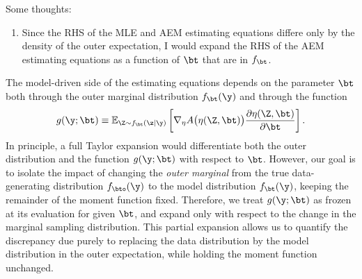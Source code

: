 Some thoughts:
\begin{enumerate}
    \item Since the RHS of the MLE and AEM estimating equations differe only by the density of the outer expectation, I would expand the RHS of the AEM estimating equations as a function of $\bt$ that are in $f_\bt$. 
\end{enumerate}
The model-driven side of the estimating equations depends on the parameter $\bt$ both through the outer marginal distribution $f_\bt(\y)$ and through the function
\[
g(\y; \bt) 
\equiv 
\mathbb{E}_{\Z \sim f_\bt(\z \mid \y)}
\left[
    \nabla_\eta A\bigl(\eta(\Z, \bt)\bigr)
    \frac{\partial \eta(\Z, \bt)}{\partial \bt}
\right].
\]
In principle, a full Taylor expansion would differentiate both the outer distribution and the function $g(\y; \bt)$ with respect to $\bt$. However, our goal is to isolate the impact of changing the \emph{outer marginal} from the true data-generating distribution $f_{\bto}(\y)$ to the model distribution $f_\bt(\y)$, keeping the remainder of the moment function fixed. Therefore, we treat $g(\y; \bt)$ as frozen at its evaluation for given $\bt$, and expand only with respect to the change in the marginal sampling distribution. This partial expansion allows us to quantify the discrepancy due purely to replacing the data distribution by the model distribution in the outer expectation, while holding the moment function unchanged.

